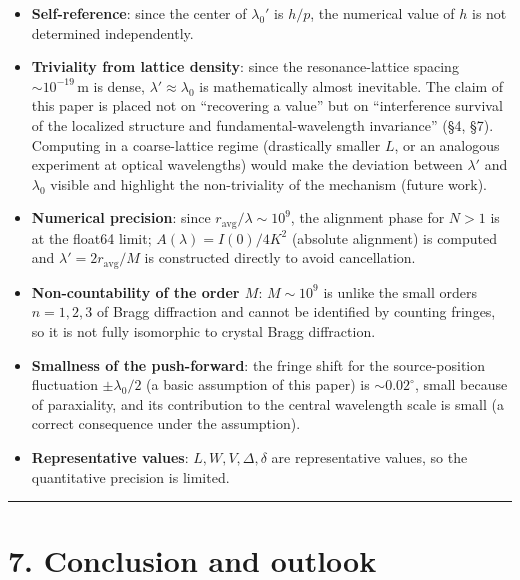 \documentclass[11pt,a4paper]{article}
\providecommand{\tightlist}{\setlength{\itemsep}{0pt}\setlength{\parskip}{0pt}}
\begin{document}
\begin{itemize}
\tightlist
\item
  \textbf{Self-reference}: since the center of \(\lambda_0'\) is
  \(h/p\), the numerical value of \(h\) is not determined independently.
\item
  \textbf{Triviality from lattice density}: since the resonance-lattice
  spacing \(\sim10^{-19}\,\mathrm{m}\) is dense,
  \(\lambda'\approx\lambda_0\) is mathematically almost inevitable. The
  claim of this paper is placed not on ``recovering a value'' but on
  ``interference survival of the localized structure and
  fundamental-wavelength invariance'' (§4, §7). Computing in a
  coarse-lattice regime (drastically smaller \(L\), or an analogous
  experiment at optical wavelengths) would make the deviation between
  \(\lambda'\) and \(\lambda_0\) visible and highlight the
  non-triviality of the mechanism (future work).
\item
  \textbf{Numerical precision}: since
  \(r_{\mathrm{avg}}/\lambda\sim10^9\), the alignment phase for \(N>1\)
  is at the float64 limit; \(A(\lambda)=I(0)/4K^2\) (absolute alignment)
  is computed and \(\lambda'=2r_{\mathrm{avg}}/M\) is constructed
  directly to avoid cancellation.
\item
  \textbf{Non-countability of the order \(M\)}: \(M\sim10^9\) is unlike
  the small orders \(n=1,2,3\) of Bragg diffraction and cannot be
  identified by counting fringes, so it is not fully isomorphic to
  crystal Bragg diffraction.
\item
  \textbf{Smallness of the push-forward}: the fringe shift for the
  source-position fluctuation \(\pm\lambda_0/2\) (a basic assumption of
  this paper) is \(\sim0.02^\circ\), small because of paraxiality, and
  its contribution to the central wavelength scale is small (a correct
  consequence under the assumption).
\item
  \textbf{Representative values}: \(L,W,V,\Delta,\delta\) are
  representative values, so the quantitative precision is limited.
\end{itemize}

\begin{center}\rule{0.5\linewidth}{0.5pt}\end{center}

\section{7. Conclusion and outlook}\label{conclusion-and-outlook}
\end{document}
